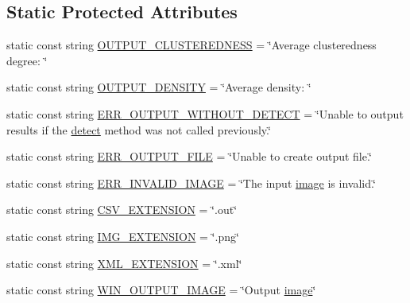 \subsection*{\-Static \-Protected \-Attributes}
\begin{DoxyCompactItemize}
\item 
static const string \hyperlink{classmultiscale_1_1analysis_1_1Detector_a8793daa563094fdcd7447930a4fc0974}{\-O\-U\-T\-P\-U\-T\-\_\-\-C\-L\-U\-S\-T\-E\-R\-E\-D\-N\-E\-S\-S} = \char`\"{}\-Average clusteredness degree\-: \char`\"{}
\item 
static const string \hyperlink{classmultiscale_1_1analysis_1_1Detector_a920029d6b618aa2daaccfb824c5878b8}{\-O\-U\-T\-P\-U\-T\-\_\-\-D\-E\-N\-S\-I\-T\-Y} = \char`\"{}\-Average density\-: \char`\"{}
\item 
static const string \hyperlink{classmultiscale_1_1analysis_1_1Detector_a5837f0e4ffef6410774ff9bcda72238b}{\-E\-R\-R\-\_\-\-O\-U\-T\-P\-U\-T\-\_\-\-W\-I\-T\-H\-O\-U\-T\-\_\-\-D\-E\-T\-E\-C\-T} = \char`\"{}\-Unable to output results if the \hyperlink{classmultiscale_1_1analysis_1_1Detector_acfb9aaec94382e4a7bee6d9874d4bcef}{detect} method was not called previously.\char`\"{}
\item 
static const string \hyperlink{classmultiscale_1_1analysis_1_1Detector_aab6b3a68e93cad9a93885e52f1c2ce04}{\-E\-R\-R\-\_\-\-O\-U\-T\-P\-U\-T\-\_\-\-F\-I\-L\-E} = \char`\"{}\-Unable to create output file.\char`\"{}
\item 
static const string \hyperlink{classmultiscale_1_1analysis_1_1Detector_aa5dc8982745f567379e0eccd416c6820}{\-E\-R\-R\-\_\-\-I\-N\-V\-A\-L\-I\-D\-\_\-\-I\-M\-A\-G\-E} = \char`\"{}\-The input \hyperlink{classmultiscale_1_1analysis_1_1Detector_a523830a6cfe409694ce8327c3c736fbd}{image} is invalid.\char`\"{}
\item 
static const string \hyperlink{classmultiscale_1_1analysis_1_1Detector_a5458417daa8430ea8ebbe1c25cb26f41}{\-C\-S\-V\-\_\-\-E\-X\-T\-E\-N\-S\-I\-O\-N} = \char`\"{}.out\char`\"{}
\item 
static const string \hyperlink{classmultiscale_1_1analysis_1_1Detector_acc73b4fb215305ffd7f3d6df8807cc5e}{\-I\-M\-G\-\_\-\-E\-X\-T\-E\-N\-S\-I\-O\-N} = \char`\"{}.png\char`\"{}
\item 
static const string \hyperlink{classmultiscale_1_1analysis_1_1Detector_a89d56e81155e57f3dcaeef293e89efc2}{\-X\-M\-L\-\_\-\-E\-X\-T\-E\-N\-S\-I\-O\-N} = \char`\"{}.xml\char`\"{}
\item 
static const string \hyperlink{classmultiscale_1_1analysis_1_1Detector_a883b5de8d273a2bfab31e45bc285c78d}{\-W\-I\-N\-\_\-\-O\-U\-T\-P\-U\-T\-\_\-\-I\-M\-A\-G\-E} = \char`\"{}\-Output \hyperlink{classmultiscale_1_1analysis_1_1Detector_a523830a6cfe409694ce8327c3c736fbd}{image}\char`\"{}

\end{DoxyCompactItemize}
